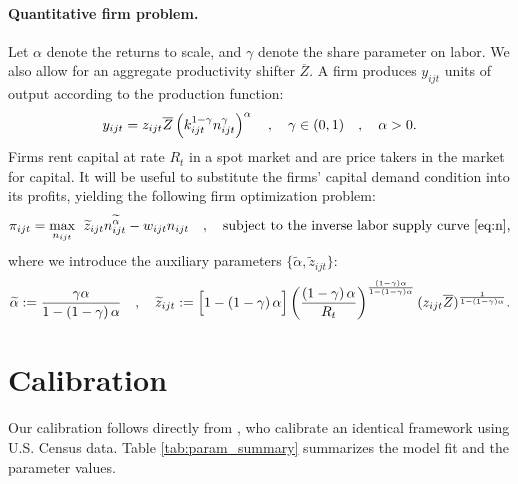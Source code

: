 \documentclass[12pt]{article}
\theoremstyle{prop}
\begin{document}
\paragraph{Quantitative firm problem.} Let $\alpha$ denote the returns to scale, and $\gamma$ denote the share parameter on labor.
We also allow for an aggregate productivity shifter  $\overline{Z}$.
A firm produces $y_{ijt}$ units of output according to the production function:
{\small
	\vspace*{-.2cm}\begin{equation*}
		y_{ijt} = z_{ijt} \overline{Z} \left(k_{ijt}^{1-\gamma}n_{ijt}^\gamma\right)^\alpha \quad,\quad \gamma\in(0,1)\quad,\quad \alpha>0.
		\vspace*{-.2cm}\end{equation*}}%
Firms rent capital at rate $R_t$ in a spot market and are price takers in the market for capital. It will be useful to substitute the firms' capital demand condition into its profits, yielding the following firm optimization problem:
{\small
	\vspace*{-.2cm}\begin{equation*}\label{eq:firm_pi_widetilde}
		\pi_{ijt}  =\max_{n_{ijt}}\:\: \widetilde{z}_{ijt}  n_{ijt}^{\widetilde{\alpha}}-w_{ijt}n_{ijt}\quad,\quad \text{subject to the inverse labor supply curve \eqref{eq:n},}
		\vspace*{-.2cm}\end{equation*}}%
where we introduce the auxiliary parameters $\{\widetilde{\alpha},\widetilde{z}_{ijt}\}$:
{\small
	\vspace*{-.2cm}\begin{equation*}
		\widetilde{\alpha}:=\frac{\gamma\alpha}{1-\left(1-\gamma\right)\alpha}  \quad,\quad  \widetilde{z}_{ijt}:=\Big[1-\left(1-\gamma\right)\alpha\Big]\left(\frac{\left(1-\gamma\right)\alpha}{R_t}\right)^{\frac{\left(1-\gamma\right)\alpha}{1-\left(1-\gamma\right)\alpha}}(z_{ijt}\overline{Z})^{\frac{1}{1-\left(1-\gamma\right)\alpha}}.
		\vspace*{-.2cm}\end{equation*}}


\section{Calibration}\label{sec:calibration}
 
Our calibration follows directly from , who calibrate an identical framework using U.S. Census data. Table \ref{tab:param_summary} summarizes the model fit and the parameter values. 
\end{document}
